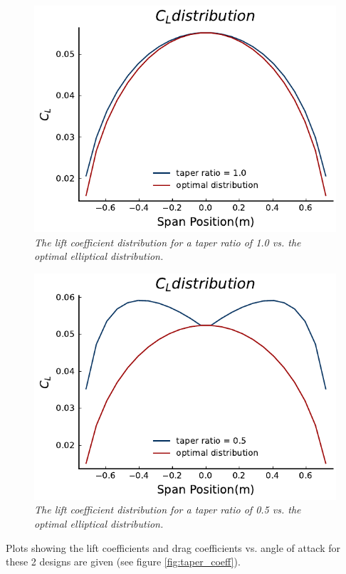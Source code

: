 \documentclass{journal}
\begin{document}
	\begin{figure}[H]
		\includegraphics{../graphics/cl_dist.pdf}
		\caption{\emph{The lift coefficient distribution for a taper ratio of 1.0 vs. the optimal elliptical distribution.}}
		\label{fig:cl_dist}
	\end{figure}
	\begin{figure}[H]
		\includegraphics{../graphics/cl_dist_compare.pdf}
		\caption{\emph{The lift coefficient distribution for a taper ratio of 0.5 vs. the optimal elliptical distribution.}}
		\label{fig:cl_dist_compare}
	\end{figure}
	
	Plots showing the lift coefficients and drag coefficients vs. angle of attack for these 2 designs are given (see figure \ref{fig:taper_coeff}).
	
\end{document}
